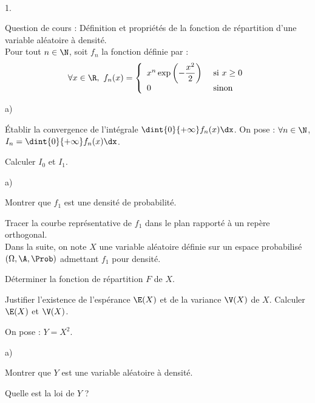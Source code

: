\documentclass[11pt]{article}
\begin{document}
\begin{exerciceAP}~
\begin{noliste}{1.}
    \setlength{\itemsep}{2mm}
  \item Question de cours : Définition et propriétés de la fonction de 
  répartition d'une variable aléatoire à densité.\\
  Pour tout $n\in\N$, soit $f_n$ la fonction définie par :
  \[
    \forall x\in\R, \ f_n(x)= \left\{
    \begin{array}{ll}
      x^n \exp\left(-\dfrac{x^2}{2}\right) & \mbox{ si $x\geq 0$}\\
      0 & \mbox{ sinon}
    \end{array}
    \right.
  \]
  
  \item 
  \begin{noliste}{a)}
    \setlength{\itemsep}{2mm}
    \item Établir la convergence de l'intégrale $\dint{0}{+\infty} 
    f_n(x)\dx$. On pose : $\forall n\in\N$, $I_n=\dint{0}{+\infty} 
    f_n(x)\dx$.
    
    \item Calculer $I_0$ et $I_1$.
  \end{noliste}
  
  \item 
  \begin{noliste}{a)}
    \setlength{\itemsep}{2mm}
    \item Montrer que $f_1$ est une densité de probabilité.
    
    \item Tracer la courbe représentative de $f_1$ dans le plan 
    rapporté à un repère orthogonal.\\
    Dans la suite, on note $X$ une variable aléatoire définie sur 
    un espace probabilisé $(\Omega, \A,\Prob)$ admettant $f_1$ 
    pour densité.
    
    \item Déterminer la fonction de répartition $F$ de $X$.
    
    \item Justifier l'existence de l'espérance $\E(X)$ et de la 
    variance $\V(X)$ de $X$. Calculer $\E(X)$ et $\V(X)$.
  \end{noliste}
  
  \item On pose : $Y=X^2$.
  \begin{noliste}{a)}
    \setlength{\itemsep}{2mm}
    \item Montrer que $Y$ est une variable aléatoire à densité.
    
    \item Quelle est la loi de $Y$ ?
  \end{noliste}
\end{noliste}
\end{exerciceAP}
\end{document}
